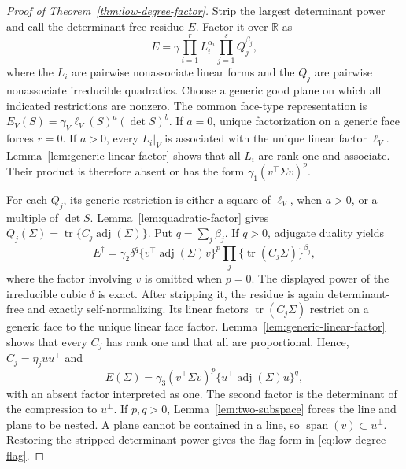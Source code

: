 \documentclass[12pt,a4paper]{article}
\theoremstyle{plain}
\theoremstyle{definition}
\newcommand{\R}{\mathbb{R}}
\newcommand{\tr}{\operatorname{tr}}
\newcommand{\adjm}{\operatorname{adj}}
\newcommand{\Span}{\operatorname{span}}
\begin{document}
\begin{proof}[Proof of Theorem~\ref{thm:low-degree-factor}]
    Strip the largest determinant power and call the determinant-free residue $E$.
    Factor it over $\R$ as
    \begin{equation*}
        E
        =
        \gamma
        \prod_{i=1}^rL_i^{\alpha_i}
        \prod_{j=1}^sQ_j^{\beta_j}
        ,
    \end{equation*}
    where the $L_i$ are pairwise nonassociate linear forms and the $Q_j$ are pairwise nonassociate irreducible quadratics.
    Choose a generic good plane on which all indicated restrictions are nonzero.
    The common face-type representation is $E_V(S)=\gamma_V\ell_V(S)^a(\det S)^b$.
    If $a=0$, unique factorization on a generic face forces $r=0$.
    If $a>0$, every $L_i|_V$ is associated with the unique linear factor $\ell_V$.
    Lemma~\ref{lem:generic-linear-factor} shows that all $L_i$ are rank-one and associate.
    Their product is therefore absent or has the form $\gamma_1(v^\top\Sigma v)^p$.

    For each $Q_j$, its generic restriction is either a square of $\ell_V$, when $a>0$, or a multiple of $\det S$.
    Lemma~\ref{lem:quadratic-factor} gives $Q_j(\Sigma)=\tr\{C_j\adjm(\Sigma)\}$.
    Put $q=\sum_j\beta_j$.
    If $q>0$, adjugate duality yields
    \begin{equation*}
        E^\dagger
        =
        \gamma_2\delta^q
        \{v^\top\adjm(\Sigma)v\}^p
        \prod_j\{\tr(C_j\Sigma)\}^{\beta_j}
        ,
    \end{equation*}
    where the factor involving $v$ is omitted when $p=0$.
    The displayed power of the irreducible cubic $\delta$ is exact.
    After stripping it, the residue is again determinant-free and exactly self-normalizing.
    Its linear factors $\tr(C_j\Sigma)$ restrict on a generic face to the unique linear face factor.
    Lemma~\ref{lem:generic-linear-factor} shows that every $C_j$ has rank one and that all are proportional.
    Hence, $C_j=\eta_j uu^\top$ and
    \begin{equation*}
        E(\Sigma)
        =
        \gamma_3(v^\top\Sigma v)^p
        \{u^\top\adjm(\Sigma)u\}^q
        ,
    \end{equation*}
    with an absent factor interpreted as one.
    The second factor is the determinant of the compression to $u^\perp$.
    If $p,q>0$, Lemma~\ref{lem:two-subspace} forces the line and plane to be nested.
    A plane cannot be contained in a line, so $\Span(v)\subset u^\perp$.
    Restoring the stripped determinant power gives the flag form in \eqref{eq:low-degree-flag}.
\end{proof}
\end{document}
